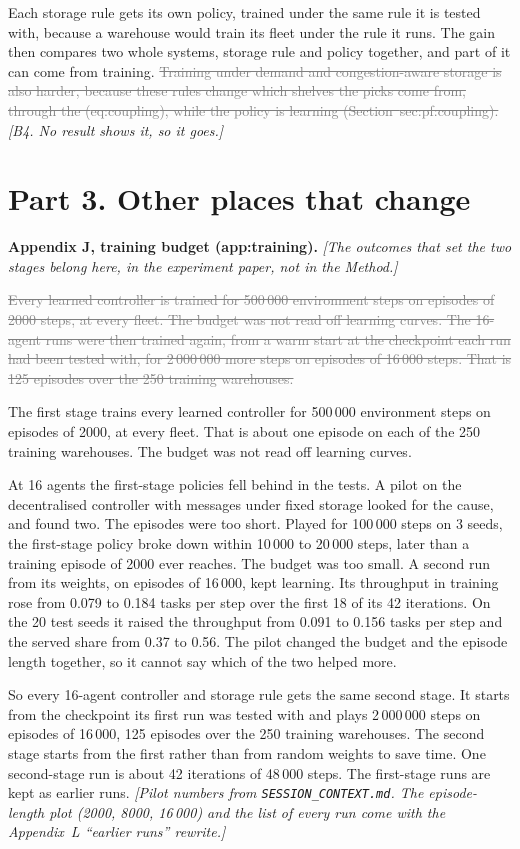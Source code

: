 \documentclass[11pt,a4paper]{article}
\newcommand{\new}[1]{\textcolor{newc}{#1}}
\newcommand{\old}[1]{\textcolor{gray}{\sout{#1}}}
\newcommand{\note}[1]{{\small\itshape [#1]}}
\newcommand{\lab}[1]{\textsf{\footnotesize #1}}
\renewcommand{\ref}[1]{\lab{#1}}
\newcommand{\nref}[1]{the (\lab{#1})}
\begin{document}
Each storage rule gets its own policy, trained under the same rule it is
tested with, because a warehouse would train its fleet under the rule it
runs. The gain then compares two whole systems, storage rule and policy
together, and part of it can come from training. \old{Training under demand
and congestion-aware storage is also harder, because these rules change which
shelves the picks come from, through \nref{eq:coupling}, while the policy is
learning (Section~\ref{sec:pf:coupling}).} \note{B4. No result shows it, so
it goes.}

\section*{Part 3. Other places that change}

\textbf{Appendix J, training budget (\lab{app:training}).} \note{The outcomes
that set the two stages belong here, in the experiment paper, not in the
Method.}

\old{Every learned controller is trained for 500\,000 environment steps on
episodes of 2000 steps, at every fleet. The budget was not read off learning
curves. The 16-agent runs were then trained again, from a warm start at the
checkpoint each run had been tested with, for 2\,000\,000 more steps on
episodes of 16\,000 steps. That is 125 episodes over the 250 training
warehouses.}

\new{The first stage trains every learned controller for 500\,000 environment
steps on episodes of 2000, at every fleet. That is about one episode on each
of the 250 training warehouses. The budget was not read off learning curves.}

\new{At 16 agents the first-stage policies fell behind in the tests. A pilot
on the decentralised controller with messages under fixed storage looked for
the cause, and found two. The episodes were too short. Played for 100\,000
steps on 3 seeds, the first-stage policy broke down within 10\,000 to 20\,000
steps, later than a training episode of 2000 ever reaches. The budget was too
small. A second run from its weights, on episodes of 16\,000, kept learning.
Its throughput in training rose from 0.079 to 0.184 tasks per step over the
first 18 of its 42 iterations. On the 20 test seeds it raised the throughput
from 0.091 to 0.156 tasks per step and the served share from 0.37 to 0.56.
The pilot changed the budget and the episode length together, so it cannot
say which of the two helped more.}

\new{So every 16-agent controller and storage rule gets the same second stage.
It starts from the checkpoint its first run was tested with and plays
2\,000\,000 steps on episodes of 16\,000, 125 episodes over the 250 training
warehouses. The second stage starts from the first rather than from random
weights to save time. One second-stage run is about 42 iterations of 48\,000
steps. The first-stage runs are kept as earlier runs.} \note{Pilot numbers
from \texttt{SESSION\_CONTEXT.md}. The episode-length plot (2000, 8000,
16\,000) and the list of every run come with the Appendix~L ``earlier runs''
rewrite.}
\end{document}
